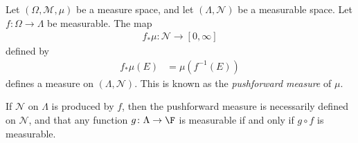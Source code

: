%
\begin{definition}
  Let $\left(\Omega,\mathcal{M},\mu\right)$ be a measure space, and let $\left(\Lambda,\mathcal{N}\right)$ be a measurable space. Let $f\colon \Omega\rightarrow \Lambda$ be measurable. The map
  \begin{align*}
    f_{\ast}\mu\colon \mathcal{N}\rightarrow [0,\infty]
  \end{align*}
  defined by
  \begin{align*}
    f_{\ast}\mu\left(E\right) &= \mu\left(f^{-1}\left(E\right)\right)
  \end{align*}
  defines a measure on $\left(\Lambda,\mathcal{N}\right)$. This is known as the \textit{pushforward measure} of $\mu$.\newline

  If $\mathcal{N}$ on $\Lambda$ is produced by $f$, then the pushforward measure is necessarily defined on $\mathcal{N}$, and that any function $g\colon \Lambda\rightarrow \F$ is measurable if and only if $g\circ f$ is measurable.
\end{definition}
